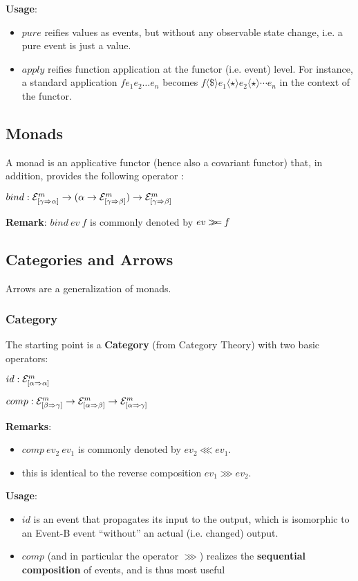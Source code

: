 \documentclass{article}
\newcommand{\EV}[3]{\ensuremath{{\cal{E}}^{#1}_{[#2 \Rightarrow #3]}}}
\newcommand{\FMAP}{\ensuremath{\langle \$ \rangle}}
\newcommand{\APPLY}{\ensuremath{\langle \star \rangle}}
\newcommand{\BIND}{\mathbin{>\!\!\!>\mkern-6.7mu=}}
\newcommand{\COMP}{\lll} %
\newcommand{\SEQ}{\ggg} %
\begin{document}
\textbf{Usage}: 
\begin{itemize}
\item $pure$ reifies values as events, but without any observable state change, i.e. a pure event is just a value.
\item $apply$ reifies function application at the functor (i.e. event) level. For instance, a standard application $f e_1 e_2 \ldots e_n$ becomes $f \FMAP e_1 \APPLY e_2 \APPLY \cdots e_n$ in the context of the functor. 
\end{itemize}

\subsection{Monads}

A monad is an applicative functor (hence also a covariant functor) that, in addition, provides the following operator :

$bind: \EV{m}{\gamma}{\alpha} \rightarrow (\alpha \rightarrow \EV{m}{\gamma}{\beta}) \rightarrow \EV{m}{\gamma}{\beta}$

\textbf{Remark}: $bind~ev~f$ is commonly denoted by $ev \BIND f$

\subsection{Categories and Arrows}

Arrows are a generalization of monads.

\subsubsection{Category}

The starting point is a \textbf{Category} (from Category Theory) with two basic operators:

$id : \EV{m}{\alpha}{\alpha}$

$comp : \EV{m}{\beta}{\gamma} \rightarrow \EV{m}{\alpha}{\beta} \rightarrow \EV{m}{\alpha}{\gamma}$

\textbf{Remarks}:  
\begin{itemize}
\item $comp~ev_2~ev_1$ is commonly denoted by $ev_2 \COMP ev_1$. 
\item this is identical to the reverse composition $ev_1 \SEQ ev_2$.
\end{itemize}

\textbf{Usage}:
\begin{itemize}
\item $id$ is an event that propagates its input to the output, which is isomorphic to an Event-B event ``without'' an actual (i.e. changed) output.
\item $comp$ (and in particular the operator $\SEQ$) realizes the \textbf{sequential composition} of events, and is thus most useful
\end{itemize}
\end{document}
